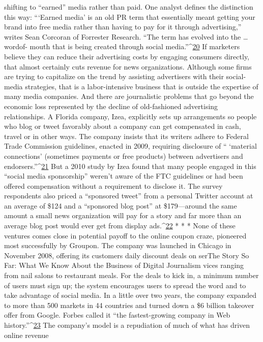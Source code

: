 shifting to ``earned'' media rather than paid. One analyst defines the distinction
this way: ``‘Earned media’ is an old PR term that essentially meant getting your
brand into free media rather than having to pay for it through advertising,'' writes
Sean Corcoran of Forrester Research. ``The term has evolved into the … wordof-
mouth that is being created through social media.''^{\href{#endnotes-ch8}{20}}
If marketers believe they can reduce their advertising costs by engaging consumers
directly, that almost certainly cuts revenue for news organizations. Although
some firms are trying to capitalize on the trend by assisting advertisers
with their social-media strategies, that is a labor-intensive business that is outside
the expertise of many media companies.
And there are journalistic problems that go beyond the economic loss represented
by the decline of old-fashioned advertising relationships. A Florida company,
Izea, explicitly sets up arrangements so people who blog or tweet favorably
about a company can get compensated in cash, travel or in other ways. The
company insists that its writers adhere to Federal Trade Commission guidelines,
enacted in 2009, requiring disclosure of `` ‘material connections’ (sometimes payments
or free products) between advertisers and endorsers.''^{\href{#endnotes-ch8}{21}}
But a 2010 study by Izea found that many people engaged in this ``social media
sponsorship'' weren’t aware of the FTC guidelines or had been offered compensation
without a requirement to disclose it. The survey respondents also priced a
``sponsored tweet'' from a personal Twitter account at an average of \$124 and a
``sponsored blog post'' at \$179—around the same amount a small news organization
will pay for a story and far more than an average blog post would ever get
from display ads.^{\href{#endnotes-ch8}{22}}
* * *
None of these ventures comes close in potential payoff to the online coupon
craze, pioneered most successfully by Groupon. The company was launched in
Chicago in November 2008, offering its customers daily discount deals on serThe
Story So Far: What We Know About the Business of Digital Journalism
vices ranging from nail salons to restaurant meals. For the deals to kick in, a
minimum number of users must sign up; the system encourages users to spread
the word and to take advantage of social media.
In a little over two years, the company expanded to more than 500 markets in
44 countries and turned down a \$6 billion takeover offer from Google. Forbes
called it ``the fastest-growing company in Web history.''^{\href{#endnotes-ch8}{23}}
The company’s model is a repudiation of much of what has driven online revenue
